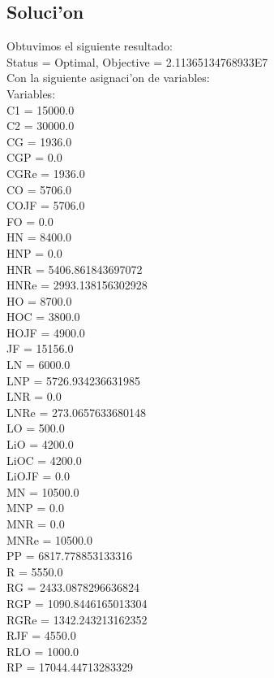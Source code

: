 \subsection{Soluci'on}
Obtuvimos el siguiente resultado: \\
Status = Optimal, Objective = 2.11365134768933E7\\
Con la siguiente asignaci'on de variables:\\
Variables: \\
C1 = 15000.0\\
C2 = 30000.0\\
CG = 1936.0\\
CGP = 0.0\\
CGRe = 1936.0\\
CO = 5706.0\\
COJF = 5706.0\\
FO = 0.0\\
HN = 8400.0\\
HNP = 0.0\\
HNR = 5406.861843697072\\
HNRe = 2993.138156302928\\
HO = 8700.0\\
HOC = 3800.0\\
HOJF = 4900.0\\
JF = 15156.0\\
LN = 6000.0\\
LNP = 5726.934236631985\\
LNR = 0.0\\
LNRe = 273.0657633680148\\
LO = 500.0\\
LiO = 4200.0\\
LiOC = 4200.0\\
LiOJF = 0.0\\
MN = 10500.0\\
MNP = 0.0\\
MNR = 0.0\\
MNRe = 10500.0\\
PP = 6817.778853133316\\
R = 5550.0\\
RG = 2433.0878296636824\\
RGP = 1090.8446165013304\\
RGRe = 1342.243213162352\\
RJF = 4550.0\\
RLO = 1000.0\\
RP = 17044.44713283329\\
